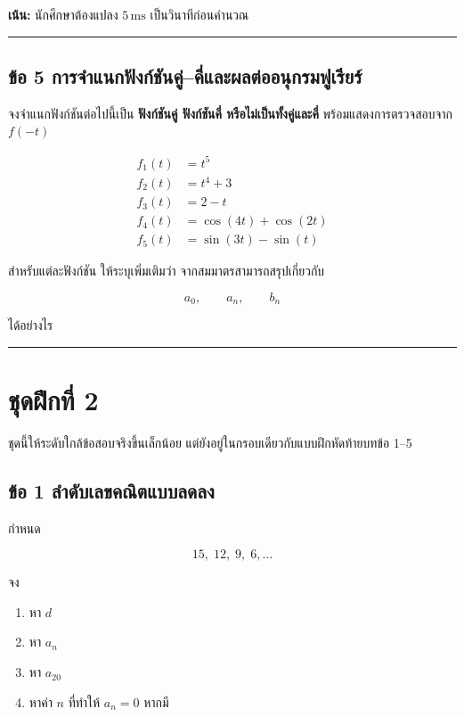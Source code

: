 \textbf{เน้น:} นักศึกษาต้องแปลง \(5\,\text{ms}\) เป็นวินาทีก่อนคำนวณ

\par\noindent\rule{\textwidth}{0.4pt}\par

\subsection{ข้อ 5 การจำแนกฟังก์ชันคู่–คี่และผลต่ออนุกรมฟูเรียร์}

จงจำแนกฟังก์ชันต่อไปนี้เป็น \textbf{ฟังก์ชันคู่ ฟังก์ชันคี่ หรือไม่เป็นทั้งคู่และคี่} พร้อมแสดงการตรวจสอบจาก \(f(-t)\)

\[
\begin{aligned}
f_1(t)&=t^5\\
f_2(t)&=t^4+3\\
f_3(t)&=2-t\\
f_4(t)&=\cos(4t)+\cos(2t)\\
f_5(t)&=\sin(3t)-\sin(t)
\end{aligned}
\]

สำหรับแต่ละฟังก์ชัน ให้ระบุเพิ่มเติมว่า จากสมมาตรสามารถสรุปเกี่ยวกับ

\[
a_0,\qquad a_n,\qquad b_n
\]

ได้อย่างไร

\par\noindent\rule{\textwidth}{0.4pt}\par

\section{ชุดฝึกที่ 2}

ชุดนี้ให้ระดับใกล้ข้อสอบจริงขึ้นเล็กน้อย แต่ยังอยู่ในกรอบเดียวกับแบบฝึกหัดท้ายบทข้อ 1–5

\subsection{ข้อ 1 ลำดับเลขคณิตแบบลดลง}

กำหนด

\[
15,\;12,\;9,\;6,\ldots
\]

จง

\begin{enumerate}
    \item หา \(d\)
    \item หา \(a_n\)
    \item หา \(a_{20}\)
    \item หาค่า \(n\) ที่ทำให้ \(a_n=0\) หากมี
\end{enumerate}

